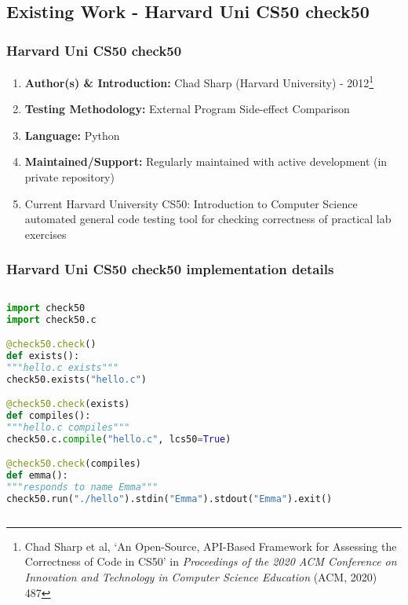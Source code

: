 \documentclass[xcolor]{beamer}
\begin{document}
\subsection{Existing Work - Harvard Uni CS50 check50}
\begin{frame}
	\frametitle{Harvard Uni CS50 check50}
	\begin{enumerate}
		\setlength\itemsep{1em}
		\item \textbf{Author(s) \& Introduction:} Chad Sharp (Harvard University) - 2012\footnote{Chad Sharp et al, ‘An Open-Source, API-Based Framework for Assessing the Correctness of Code in CS50’ in \textit{Proceedings of the 2020 ACM Conference on Innovation and Technology in Computer Science Education} (ACM, 2020) 487}
			\pause
		\item \textbf{Testing Methodology:} External Program Side-effect Comparison 
			\pause
		\item \textbf{Language:} Python
			\pause
		\item \textbf{Maintained/Support:} Regularly maintained with active development (in private repository)
			\pause 
		\item Current Harvard University CS50: Introduction to Computer Science automated general code testing tool for checking correctness of practical lab exercises
	\end{enumerate}
\end{frame}
\begin{frame}[fragile]
	\frametitle{Harvard Uni CS50 check50 implementation details}
	\begin{columns}
		\begin{column}{0.55\textwidth}
			\centering		
\begin{lstlisting}[language=python, breaklines=true, caption={check50 tests}]
import check50
import check50.c

@check50.check()
def exists():
"""hello.c exists"""
check50.exists("hello.c")

@check50.check(exists)
def compiles():
"""hello.c compiles"""
check50.c.compile("hello.c", lcs50=True)

@check50.check(compiles)
def emma():
"""responds to name Emma"""
check50.run("./hello").stdin("Emma").stdout("Emma").exit()
\end{lstlisting}
		\end{column}
		\begin{column}{0.35\textwidth}
			\centering
		\end{column}
	\end{columns}
\end{frame}
\end{document}
